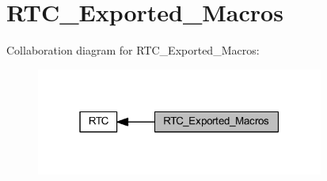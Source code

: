 \hypertarget{group___r_t_c___exported___macros}{}\section{R\+T\+C\+\_\+\+Exported\+\_\+\+Macros}
\label{group___r_t_c___exported___macros}
Collaboration diagram for R\+T\+C\+\_\+\+Exported\+\_\+\+Macros\+:
\nopagebreak
\begin{figure}[H]
\begin{center}
\leavevmode
\includegraphics[width=268pt]{group___r_t_c___exported___macros}
\end{center}
\end{figure}
